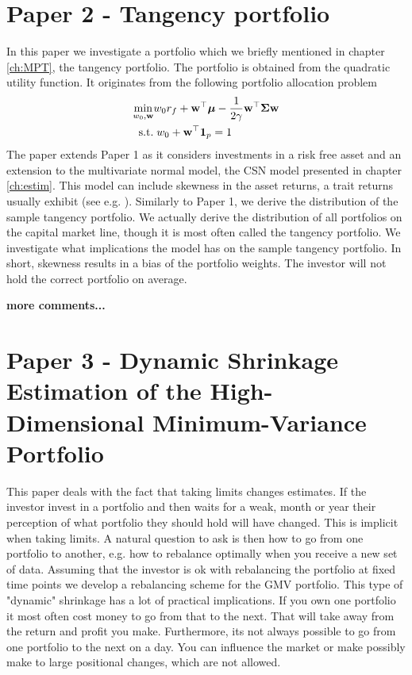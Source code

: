 \documentclass[]{book}\usepackage{knitr}
\begin{document}
\section*{Paper 2 - Tangency portfolio}\label{sec:paper2}
In this paper we investigate a portfolio which we briefly mentioned in chapter \ref{ch:MPT}, the tangency portfolio. 
The portfolio is obtained from the quadratic utility function. It originates from the following portfolio allocation problem
\begin{align}
  \min_{w_0,\mathbf{w}} & w_0 r_f + \mathbf{w}^\top \mbox{\boldmath$\mu$} - \frac{1}{2\gamma} \mathbf{w}^\top \mathbf{\Sigma} \mathbf{w} \\
  \text{ s.t.} &\; w_0 + \mathbf{w}^\top \mathbf{1}_p = 1
\end{align}
The paper extends Paper 1 as it considers investments in a risk free asset and an extension to the multivariate normal model, the CSN model presented in chapter \ref{ch:estim}. 
This model can include skewness in the asset returns, a trait returns usually exhibit (see e.g. \citet{cont2001empirical}). 
Similarly to Paper 1, we derive the distribution of the sample tangency portfolio.
We actually derive the distribution of all portfolios on the capital market line, though it is most often called the tangency portfolio.
We investigate what implications the model has on the sample tangency portfolio.
In short, skewness results in a bias of the portfolio weights. 
The investor will not hold the correct portfolio on average.

\textbf{more comments...}
\section*{Paper 3 - Dynamic Shrinkage Estimation of the High-Dimensional Minimum-Variance Portfolio}\label{sec:paper3}
This paper deals with the fact that taking limits changes estimates. 
If the investor invest in a portfolio and then waits for a weak, month or year their perception of what portfolio they should hold will have changed. 
This is implicit when taking limits.
A natural question to ask is then how to go from one portfolio to another, e.g. how to rebalance optimally when you receive a new set of data. 
Assuming that the investor is ok with rebalancing the portfolio at fixed time points we develop a rebalancing scheme for the GMV portfolio.
This type of "dynamic" shrinkage has a lot of practical implications.
If you own one portfolio it most often cost money to go from that to the next.
That will take away from the return and profit you make.
Furthermore, its not always possible to go from one portfolio to the next on a day.
You can influence the market or make possibly make to large positional changes, which are not allowed.
\end{document}
